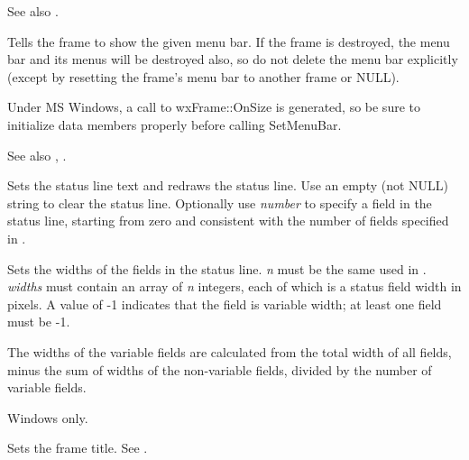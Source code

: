 See also .



Tells the frame to show the given menu bar.  If the frame is destroyed, the
menu bar and its menus will be destroyed also, so do not delete the menu
bar explicitly (except by resetting the frame's menu bar to another
frame or NULL).

Under MS Windows, a call to wxFrame::OnSize is generated, so be sure to initialize
data members properly before calling SetMenuBar.

See also , .

\label{wxframesetstatustext}


Sets the status line text and redraws the status line. Use an empty (not NULL) string
to clear the status line. Optionally use {\it number} to specify a
field in the status line, starting from zero and consistent with the number
of fields specified in .

\label{wxframesetstatuswidths}


Sets the widths of the fields in the status line. {\it n} must be the
same used in . {\it widths} must
contain an array of {\it n} integers, each of which is a status field width
in pixels. A value of -1 indicates that the field is variable width; at least one
field must be -1.

The widths of the variable fields are calculated from the total width of all fields,
minus the sum of widths of the non-variable fields, divided by the number of 
variable fields.

Windows only.

\label{wxframesettitle}


Sets the frame title. See .

\label{wxframesettoolbar}

